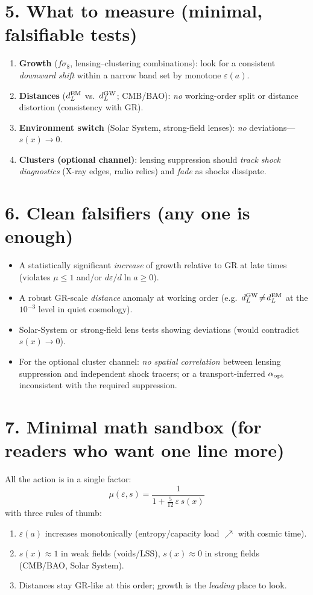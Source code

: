 \documentclass[aps,prd,onecolumn,superscriptaddress,nofootinbib]{revtex4-2}
\newcommand{\eps}{\varepsilon}
\begin{document}
\section*{5. What to measure (minimal, falsifiable tests)}
\begin{enumerate}
\item \textbf{Growth} ($f\sigma_8$, lensing--clustering combinations): look for a consistent \emph{downward shift} within a narrow band set by monotone $\eps(a)$.
\item \textbf{Distances} ($d_L^{\rm EM}$ vs.\ $d_L^{\rm GW}$; CMB/BAO): \emph{no} working-order split or distance distortion (consistency with GR).
\item \textbf{Environment switch} (Solar System, strong-field lenses): \emph{no} deviations---$s(x)\to 0$.
\item \textbf{Clusters (optional channel)}: lensing suppression should \emph{track shock diagnostics} (X-ray edges, radio relics) and \emph{fade} as shocks dissipate.
\end{enumerate}

\section*{6. Clean falsifiers (any one is enough)}
\begin{itemize}
\item A statistically significant \emph{increase} of growth relative to GR at late times (violates $\mu\le 1$ and/or $d\eps/d\ln a\ge 0$).
\item A robust GR-scale \emph{distance} anomaly at working order (e.g.\ $d_L^{\rm GW}\!\neq\!d_L^{\rm EM}$ at the $10^{-3}$ level in quiet cosmology).
\item Solar-System or strong-field lens tests showing deviations (would contradict $s(x)\!\to\!0$).
\item For the optional cluster channel: \emph{no spatial correlation} between lensing suppression and independent shock tracers; or a transport-inferred $\alpha_{\rm opt}$ inconsistent with the required suppression.
\end{itemize}

\section*{7. Minimal math sandbox (for readers who want one line more)}
All the action is in a single factor:
\[
\boxed{\quad \mu(\eps,s)=\frac{1}{1+\frac{5}{12}\,\eps\,s(x)} \quad}
\]
with three rules of thumb:
\begin{enumerate}
\item $\eps(a)$ increases monotonically (entropy/capacity load $\nearrow$ with cosmic time).
\item $s(x)\approx 1$ in weak fields (voids/LSS), $s(x)\approx 0$ in strong fields (CMB/BAO, Solar System).
\item Distances stay GR-like at this order; growth is the \emph{leading} place to look.
\end{enumerate}
\end{document}

